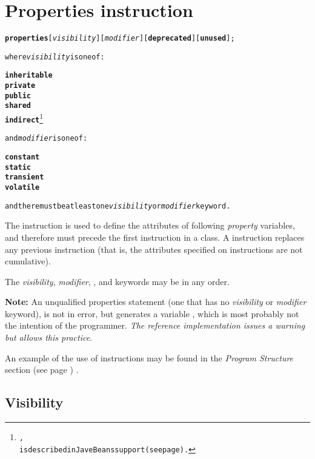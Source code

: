 \section{Properties instruction}\label{refprop}
\begin{shaded}
\begin{alltt}
\textbf{properties} [\emph{visibility}] [\emph{modifier}] [\textbf{deprecated}] [\textbf{unused}];

where \emph{visibility} is one of:

    \textbf{inheritable}
    \textbf{private}
    \textbf{public}
    \textbf{shared}
    \textbf{indirect}\footnote{
,
is described in JaveBeans support (see page \pageref{refappb}) .
}


and \emph{modifier} is one of:

    \textbf{constant}
    \textbf{static}
    \textbf{transient}
    \textbf{volatile}

and there must be at least one \emph{visibility} or \emph{modifier} keyword.
\end{alltt}
\end{shaded}
 
The  instruction is used to define the attributes
of following \emph{property} variables, and therefore must precede the
first  instruction in a class.
A  instruction replaces any previous
 instruction (that is, the attributes specified on
 instructions are not cumulative).
 
The \emph{visibility}, \emph{modifier},
, and  keywords may be in any
order.

\begin{shaded}\noindent
\textbf{Note:} An unqualified properties statement (one that has no
\emph{visibility} or \emph{modifier} keyword), is not in error, but
generates a variable , which is most probably not
the intention of the
programmer. \emph{The reference
  implementation issues a warning but allows this practice}.
\end{shaded}
 
An example of the use of  instructions may be
found in the  \emph{Program Structure} section (see page \pageref{refpstruct}) .
\subsection{Visibility}
 
